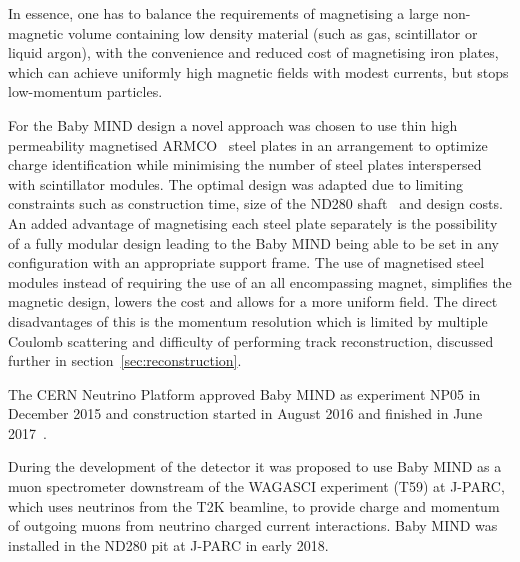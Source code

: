 In essence, one has to balance the requirements of magnetising a large non-magnetic volume containing low density material (such as gas, scintillator or liquid argon), with the convenience and reduced cost of magnetising iron plates, which can achieve uniformly high magnetic fields with modest currents, but stops low-momentum particles.


For the Baby MIND design a novel approach was chosen to use thin high permeability magnetised ARMCO~\cite{110ARMCO:Online} steel plates in an arrangement to optimize charge identification while minimising the number of steel plates interspersed with scintillator modules. The optimal design was adapted due to limiting constraints such as construction time, size of the ND280 shaft~\cite{21T2K} and design costs. An added advantage of magnetising each steel plate separately is the possibility of a fully modular design leading to the Baby MIND being able to be set in any configuration with an appropriate support frame. The use of magnetised steel modules instead of requiring the use of an all encompassing magnet, simplifies the magnetic design, lowers the cost and allows for a more uniform field. The direct disadvantages of this is the momentum resolution which is limited by multiple Coulomb scattering and difficulty of performing track reconstruction, discussed further in section~\ref{sec:reconstruction}.

The CERN Neutrino Platform approved Baby MIND as experiment NP05 in December 2015 and construction started in August 2016 and finished in June 2017~\cite{111Asfandiyarov}. 

During the development of the detector it was proposed to use Baby MIND as a muon spectrometer downstream of the WAGASCI experiment (T59) at J-PARC, which uses neutrinos from the T2K beamline, to provide charge and momentum of outgoing muons from neutrino charged current interactions. Baby MIND was installed in the ND280 pit at J-PARC in early 2018.




